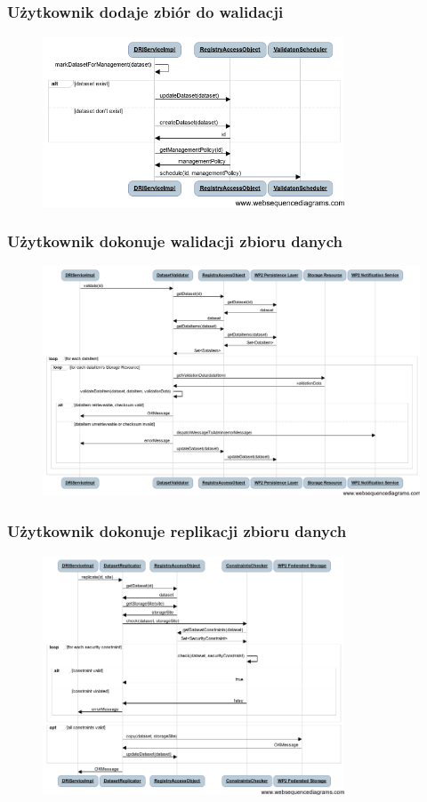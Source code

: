 \documentclass{beamer}
\begin{document}
\begin{frame}
\frametitle{Użytkownik dodaje zbiór do walidacji}
\begin{figure}
\includegraphics[width=0.8\textwidth]{registration-diagram.png}
\end{figure}
\end{frame}

\begin{frame}
\frametitle{Użytkownik dokonuje walidacji zbioru danych}
\begin{figure}
\includegraphics[width=1.0\textwidth]{validation-diagram.png}
\end{figure}
\end{frame}

\begin{frame}
\frametitle{Użytkownik dokonuje replikacji zbioru danych}
\begin{figure}
\includegraphics[width=0.8\textwidth]{replication-diagram.png}
\end{figure}
\end{frame}
\end{document}

